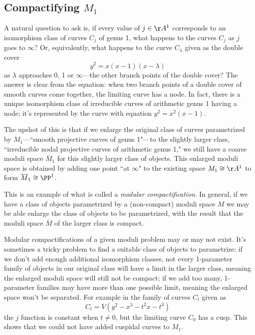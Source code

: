 \subsection{Compactifying $M_1$}

A natural question to ask is, if every value of $j \in \AA^1$ corresponds to an isomorphism class of curves $C_j$ of genus 1, what happens to the curves $C_j$ as $j$ goes to $\infty$? Or, equivalently, what happens to the curve $C_\lambda$ given as the double cover
$$
y^2 = x(x-1)(x - \lambda)
$$
as $\lambda$ approaches 0, 1 or $\infty$---the other branch points of the double cover? The answer is clear from the equation: when two branch points of a double cover of smooth curves come together, the limiting curve has a node. In fact, there is a unique isomorphism class of irreducible curves of arithmetic genus 1 having a node; it's represented by the curve with equation $y^2=x^2(x-1)$.


The upshot of this is that if we enlarge the original class of curves parametrized by $M_1$---``smooth projective curves of genus 1"---to the slightly larger class, ``irreducible nodal projective curves of arithmetic genus 1," we still have a coarse moduli space $\overline M_1$ for this slightly larger class of objects. This enlarged moduli space is obtained by adding one point ``at $\infty$" to the existing space $M_1 \cong \AA^1$ to form $\overline M_1 \cong \PP^1$.

This is an example of what is called a \emph{modular compactification}. In general, if we have a class of objects parametrized by a (non-compact) moduli space $M$ we may be able enlarge the class of objects to be parametrized, with the result that the moduli space $\overline M$ of the larger class is compact. 

Modular compactifications of a given moduli problem may or may not exist. It's sometimes a tricky problem to find a suitable class of objects to parametrize: if we don't add enough additional isomorphism classes, not every 1-parameter family of objects in our original class will have a limit in the larger class, meaning the enlarged moduli space will still not be compact; if we add too many,  1-parameter families may have more than one possible limit, meaning the enlarged space won't be separated. For example in the family
 of curves $C_t$ given as
$$
C_t = V(y^2 -x^3 - t^2x - t^3)
$$
the $j$ function is constant when $t\neq 0$, but  the limiting curve $C_0$ has a cusp. This shows that
we could not have added cuspidal curves to $M_1$.

